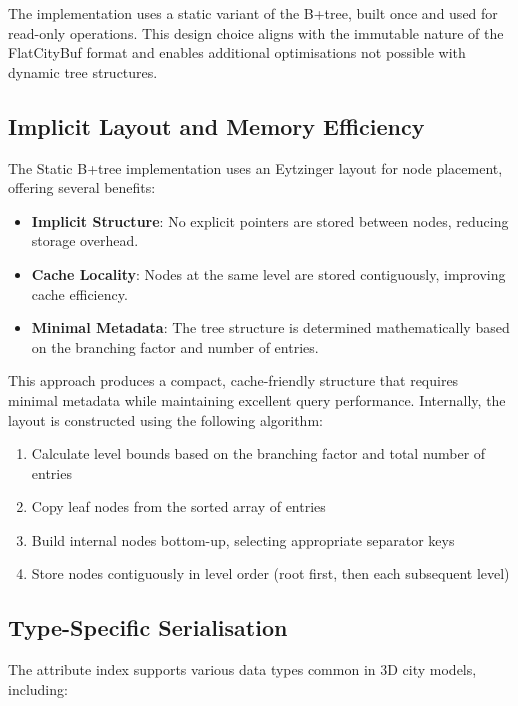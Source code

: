 The implementation uses a static variant of the B+tree, built once and used for read-only operations. This design choice aligns with the immutable nature of the FlatCityBuf format and enables additional optimisations not possible with dynamic tree structures.

\subsection{Implicit Layout and Memory Efficiency}
\label{subsec:implicit_layout}

The Static B+tree implementation uses an Eytzinger layout for node placement, offering several benefits:

\begin{itemize}
    \item \textbf{Implicit Structure}: No explicit pointers are stored between nodes, reducing storage overhead.
    \item \textbf{Cache Locality}: Nodes at the same level are stored contiguously, improving cache efficiency.
    \item \textbf{Minimal Metadata}: The tree structure is determined mathematically based on the branching factor and number of entries.
\end{itemize}

This approach produces a compact, cache-friendly structure that requires minimal metadata while maintaining excellent query performance. Internally, the layout is constructed using the following algorithm:

\begin{enumerate}
    \item Calculate level bounds based on the branching factor and total number of entries
    \item Copy leaf nodes from the sorted array of entries
    \item Build internal nodes bottom-up, selecting appropriate separator keys
    \item Store nodes contiguously in level order (root first, then each subsequent level)
\end{enumerate}

\subsection{Type-Specific Serialisation}
\label{subsec:type_specific_serialisation}

The attribute index supports various data types common in 3D city models, including:

